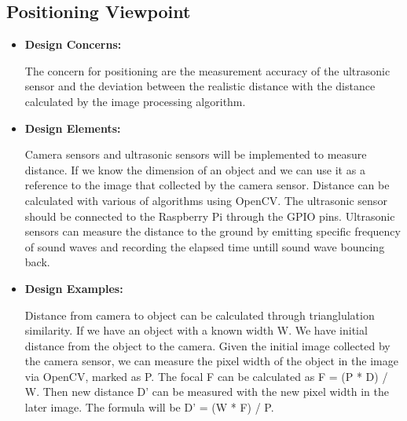 \documentclass[onecolumn, draftclsnofoot,10pt, compsoc]{IEEEtran}
\begin{document}
\subsection{Positioning Viewpoint} %
\begin{itemize}
\item{ \textbf{Design Concerns:}}

The concern for positioning are the measurement accuracy of the ultrasonic sensor and the deviation between the realistic distance with the distance calculated by the image processing algorithm.\\
\item{ \textbf{Design Elements:}}

Camera sensors and ultrasonic sensors will be implemented to measure distance. If we know the dimension of an object and we can use it as a reference to the image that collected by the camera sensor. Distance can be calculated with various of algorithms using OpenCV. The ultrasonic sensor should be connected to the Raspberry Pi through the GPIO pins. Ultrasonic sensors can measure the distance to the ground by emitting specific frequency of sound waves and recording the elapsed time untill sound wave bouncing back.\\
\item{ \textbf{Design Examples:}} %

Distance from camera to object can be calculated through trianglulation similarity. \cite{r13} If we have an object with a known width W. We have initial distance from the object to the camera. Given the initial image collected by the camera sensor, we can measure the pixel width of the object in the image via OpenCV, marked as P. The focal F can be calculated as F = (P * D) / W. Then new distance D’ can be measured with the new pixel width in the later image. The formula will be D’ = (W * F) / P.\\
\end{itemize}
\end{document}
